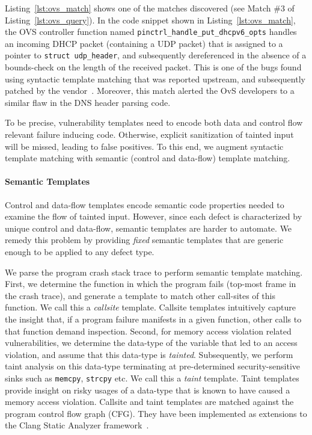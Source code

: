 Listing~\ref{lst:ovs_match} shows one of the matches discovered (see Match \#3 of Listing~\ref{lst:ovs_query}).
In the code snippet shown in Listing~\ref{lst:ovs_match}, the OVS controller function named {\tt pinctrl\_handle\_put\_dhcpv6\_opts} handles an incoming DHCP packet (containing a UDP packet) that is assigned to a pointer to {\tt struct udp\_header}, and subsequently dereferenced in the absence of a bounds-check on the length of the received packet.
This is one of the bugs found using syntactic template matching that was reported upstream, and subsequently patched by the vendor~\cite{ovsmatch}.
Moreover, this match alerted the OvS developers to a similar flaw in the DNS header parsing code.

To be precise, vulnerability templates need to encode both data and control flow relevant failure inducing code.
Otherwise, explicit sanitization of tainted input will be missed, leading to false positives.
To this end, we augment syntactic template matching with semantic (control and data-flow) template matching.

\paragraph{Semantic Templates}

Control and data-flow templates encode semantic code properties needed to examine the flow of tainted input.
However, since each defect is characterized by unique control and data-flow, semantic templates are harder to automate.
We remedy this problem by providing {\it fixed} semantic templates that are generic enough to be applied to any defect type.

We parse the program crash stack trace to perform semantic template matching.
First, we determine the function in which the program fails (top-most frame in the crash trace), and generate a template to match other call-sites of this function.
We call this a {\it callsite} template.
Callsite templates intuitively capture the insight that, if a program failure manifests in a given function, other calls to that function demand inspection.
Second, for memory access violation related vulnerabilities, we determine the data-type of the variable that led to an access violation, and assume that this data-type is {\it tainted}.
Subsequently, we perform taint analysis on this data-type terminating at pre-determined security-sensitive sinks such as {\tt memcpy}, {\tt strcpy} etc.
We call this a {\it taint} template.
Taint templates provide insight on risky usages of a data-type that is known to have caused a memory access violation.
Callsite and taint templates are matched against the program control flow graph (CFG).
They have been implemented as extensions to the Clang Static Analyzer framework~\cite{clangsa}.

